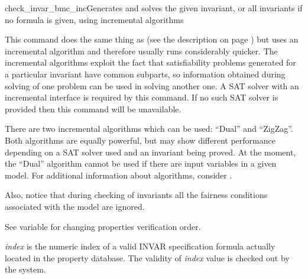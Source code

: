 \begin{nusmvCommand}{check\_invar\_bmc\_inc}{Generates and solves the given 
invariant, or all invariants if no formula is given, using incremental algorithms}
 
\cmdLine{check\_invar\_bmc\_inc [-h ] | [ -n idx | -p "formula" [IN
      context] | -P "name" ]] [-a algorithm]}

This command does the same thing as  (see the
description on page \pageref{checkInvarBmcCommand}) but uses an
incremental algorithm and therefore usually runs considerably
quicker. The incremental algorithms exploit the fact that
satisfiability problems generated for a particular invariant have
common subparts, so information obtained during solving of one problem
can be used in solving another one. A SAT solver with an incremental
interface is required by this command. If no such SAT solver is
provided then this command will be unavailable.

There are two incremental algorithms which can be used: ``Dual'' and
``ZigZag''. Both algorithms are equally powerful, but may show
different performance depending on a SAT solver used and an invariant
being proved.  At the moment, the ``Dual'' algorithm cannot be used if
there are input variables in a given model. For additional information
about algorithms, consider \cite{een04temporal}.

Also, notice that during checking of invariants all the fairness
conditions associated with the model are ignored.

See variable  for changing properties
verification order.

\begin{cmdOpt}

 { {\it index} is the numeric index of a valid
INVAR specification formula actually located in the property
database.  The validity of {\it index} value is checked out by the
system.}
       

            


\end{cmdOpt}
\end{nusmvCommand}

